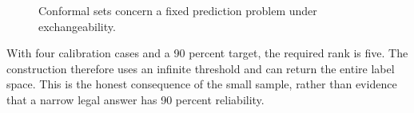 \begin{figure}[H]
\centering
{}
\caption{Conformal sets concern a fixed prediction problem under exchangeability.}\label{fig:teach-M09-09}
\end{figure}

With four calibration cases and a 90 percent target, the required rank is five. The construction therefore uses an infinite threshold and can return the entire label space. This is the honest consequence of the small sample, rather than evidence that a narrow legal answer has 90 percent reliability.

